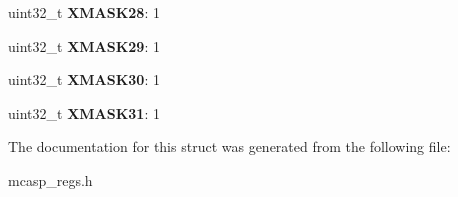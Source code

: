 \begin{DoxyCompactItemize}
\item 
\hypertarget{structMCASP__TXMASK_a55c312687e03847fa45bd805f1eea76b}{uint32\-\_\-t {\bfseries X\-M\-A\-S\-K28}\-: 1}\label{structMCASP__TXMASK_a55c312687e03847fa45bd805f1eea76b}

\item 
\hypertarget{structMCASP__TXMASK_aa56922e42c7be50d2ed19d3c85568779}{uint32\-\_\-t {\bfseries X\-M\-A\-S\-K29}\-: 1}\label{structMCASP__TXMASK_aa56922e42c7be50d2ed19d3c85568779}

\item 
\hypertarget{structMCASP__TXMASK_abfcd337cc7b4621060f17fd5ff0b0f77}{uint32\-\_\-t {\bfseries X\-M\-A\-S\-K30}\-: 1}\label{structMCASP__TXMASK_abfcd337cc7b4621060f17fd5ff0b0f77}

\item 
\hypertarget{structMCASP__TXMASK_a8896635da48f571475b7d809cdec5457}{uint32\-\_\-t {\bfseries X\-M\-A\-S\-K31}\-: 1}\label{structMCASP__TXMASK_a8896635da48f571475b7d809cdec5457}

\end{DoxyCompactItemize}


The documentation for this struct was generated from the following file\-:\begin{DoxyCompactItemize}
\item 
mcasp\-\_\-regs.\-h\end{DoxyCompactItemize}
